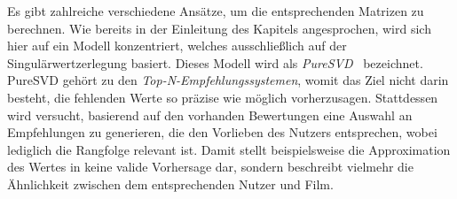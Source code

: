 Es gibt zahlreiche verschiedene Ansätze, um die entsprechenden Matrizen zu berechnen.
Wie bereits in der Einleitung des Kapitels angesprochen, wird sich hier auf ein Modell konzentriert, welches ausschließlich auf der Singulärwertzerlegung basiert.
Dieses Modell wird als \emph{PureSVD}~\cite{cremonesiPerformanceRecommenderAlgorithms2010} bezeichnet.
PureSVD gehört zu den \emph{Top-N-Empfehlungssystemen}, womit das Ziel nicht darin besteht, die fehlenden Werte so präzise wie möglich vorherzusagen.
Stattdessen wird versucht, basierend auf den vorhanden Bewertungen eine Auswahl an Empfehlungen zu generieren, die den Vorlieben des Nutzers entsprechen, wobei lediglich die Rangfolge relevant ist.
Damit stellt beispielsweise die Approximation des Wertes in  keine valide Vorhersage dar, sondern beschreibt vielmehr die Ähnlichkeit zwischen dem entsprechenden Nutzer und Film.

